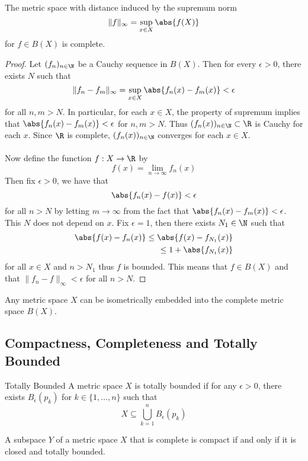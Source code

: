 \begin{prp}{}{} The metric space with distance induced by the supremum norm $$\|f\|_{\infty}=\sup_{x\in X}\abs{f(X)}$$ for $f\in B(X)$ is complete. \tcbline
\begin{proof}
Let $(f_n)_{n\in\N}$ be a Cauchy sequence in $B(X)$. Then for every $\epsilon>0$, there exists $N$ such that $$\|f_n-f_m\|_{\infty}=\sup_{x\in X}\abs{f_n(x)-f_m(x)}<\epsilon$$ for all $n,m>N$. In particular, for each $x\in X$, the property of supremum implies that $\abs{f_n(x)-f_m(x)}<\epsilon$ for $n,m>N$. Thus $(f_n(x))_{n\in\N}\subset\R$ is Cauchy for each $x$. Since $\R$ is complete, $(f_n(x))_{n\in\N}$ converges for each $x\in X$. \\~\\
Now define the function $f:X\to\R$ by $$f(x)=\lim_{n\to\infty}f_n(x)$$ Then fix $\epsilon>0$, we have that $$\abs{f_n(x)-f(x)}<\epsilon$$ for all $n>N$ by letting $m\to\infty$ from the fact that $\abs{f_n(x)-f_m(x)}<\epsilon$. This $N$ does not depend on $x$. Fix $\epsilon=1$, then there exists $N_1\in\N$ such that 
\begin{align*}
\abs{f(x)-f_n(x)}\leq\abs{f(x)-f_{N_1}(x)}\\
\leq 1+\abs{f_{N_1}(x)}
\end{align*} for all $x\in X$ and $n>N_1$ thus $f$ is bounded. This means that $f\in B(X)$ and that $\|f_n-f\|_\infty<\epsilon$ for all $n>N$. 
\end{proof}
\end{prp}

\begin{prp}{}{} Any metric space $X$ can be isometrically embedded into the complete metric space $B(X)$. 
\end{prp}

\subsection{Compactness, Completeness and Totally Bounded}
\begin{defn}{Totally Bounded}{} A metric space $X$ is totally bounded if for any $\epsilon>0$, there exists $B_\epsilon(p_k)$ for $k\in\{1,\dots,n\}$ such that $$X\subseteq\bigcup_{k=1}^nB_\epsilon(p_k)$$
\end{defn}

\begin{thm}{}{} A subspace $Y$ of a metric space $X$ that is complete is compact if and only if it is closed and totally bounded. 
\end{thm}

